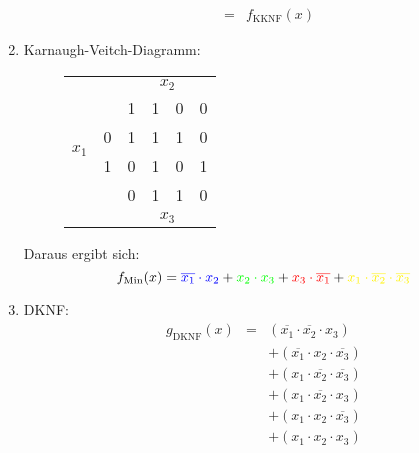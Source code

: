 \documentclass[DIN, pagenumber=false, fontsize=11pt, parskip=half]{scrartcl}
\begin{document}
\begin{enumerate}[label=(\alph*)]
\begin{eqnarray*}
                &=& f_\text{KKNF}(x)
            \end{eqnarray*}
        \item 
            Karnaugh-Veitch-Diagramm:
            \begin{figure}[H]
                \centering
                \begin{tabular}{cc|cccc}
                    & &  & \multicolumn{2}{c}{$x_2$}\\
                    & & 1 & 1 & 0 & 0\\
                    \midrule
                    \multirow{ 2}{*}{$x_1$} & 0 & \cellcolor{blue!25}1 & \cellcolor{mixtureColor!25}1 & \cellcolor{red!25}1 & 0\\
                     & 1 & 0 & \cellcolor{green!25}1 & 0 & \cellcolor{yellow!25}1\\
                    \midrule
                    & & 0 & 1 & 1 & 0\\
                    & &  & \multicolumn{2}{c}{$x_3$}\\
                \end{tabular}
            \end{figure}
            Daraus ergibt sich:
            \begin{equation*}
                f_\text{Min}(x) = \textcolor{blue}{\overline{x_1}\cdot x_2} + 
                \textcolor{green}{x_2 \cdot x_3} + 
                \textcolor{red}{x_3 \cdot \overline{x_1}}+
                \textcolor{yellow}{x_1 \cdot \overline{x_2} \cdot \overline{x_3}}
            \end{equation*}
        \item
            DKNF:
            \begin{eqnarray*}
                g_\text{DKNF}(x) &=& (\overline{x_1} \cdot \overline{x_2} \cdot x_3)\\
                &&+ (\overline{x_1} \cdot x_2 \cdot \overline{x_3})\\
                &&+ (x_1 \cdot \overline{x_2} \cdot \overline{x_3})\\
                &&+ (x_1 \cdot \overline{x_2} \cdot x_3)\\
                &&+ (x_1 \cdot x_2  \cdot \overline{x_3})\\
                &&+ (x_1 \cdot x_2 \cdot x_3)
            \end{eqnarray*}


\end{enumerate}
\end{document}
